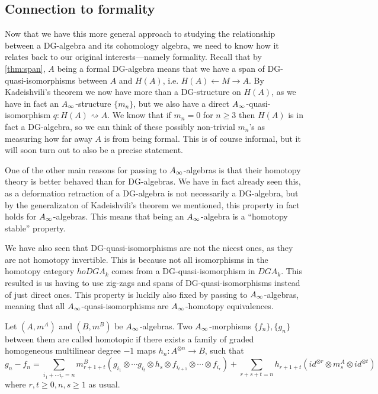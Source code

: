 \subsection{Connection to formality}

Now that we have this more general approach to studying the relationship between a DG-algebra and its cohomology algebra, we need to know how it relates back to our original interests---namely formality. Recall that by \cref{thm:span}, $A$ being a formal DG-algebra means that we have a span of DG-quasi-isomorphisms between $A$ and $H(A)$, i.e. $H(A)\longleftarrow M\longrightarrow A$. By Kadeishvili's theorem we now have more than a DG-structure on $H(A)$, as we have in fact an $\A$-structure $\{m_n\}$, but we also have a direct $\A$-quasi-isomorphism $q\colon H(A)\rightsquigarrow A$. We know that if $m_n = 0$ for $n\geq 3$ then $H(A)$ is in fact a DG-algebra, so we can think of these possibly non-trivial $m_n$'s as measuring how far away $A$ is from being formal. This is of course informal, but it will soon turn out to also be a precise statement. 

One of the other main reasons for passing to $\A$-algebras is that their homotopy theory is better behaved than for DG-algebras. We have in fact already seen this, as a deformation retraction of a DG-algebra is not necessarily a DG-algebra, but by the generalizaton of Kadeishvili's theorem we mentioned, this property in fact holds for $\A$-algebras. This means that being an $\A$-algebra is a ``homotopy stable'' property. 

We have also seen that DG-quasi-isomorphisms are not the nicest ones, as they are not homotopy invertible. This is because not all isomorphisms in the homotopy category $hoDGA_k$ comes from a DG-quasi-isomorphism in $DGA_k$. This resulted is us having to use zig-zags and spans of DG-quasi-isomorphisms instead of just direct ones. This property is luckily also fixed by passing to $\A$-algebras, meaning that all $\A$-quasi-isomorphisms are $\A$-homotopy equivalences. 


\begin{definition}[$\A$-homotopy]
\label{def:A_infinity-homotopy}
Let $(A, m^A)$ and $(B, m^B)$ be $\A$-algebras. Two $\A$-morphisms $\{f_n\}, \{g_n\}$ between them are called homotopic if there exists a family of graded homogeneous multilinear degree $-1$ maps $h_n:A^{\otimes n}\longrightarrow B$, such that 
\begin{equation*}
    g_n-f_n = \sum_{i_1+\cdots i_r = n}m^B_{r+1+t} (g_{i_1}\otimes \cdots g_{i_t}\otimes h_s \otimes f_{i_{t+1}}\otimes \cdots \otimes f_{i_r} ) + \sum_{r+s+t = n}h_{r+1+t} (id^{\otimes r}\otimes m^A_s \otimes id^{\otimes t})
\end{equation*}
where $r, t\geq 0, n, s\geq 1$ as usual. 
\end{definition}


